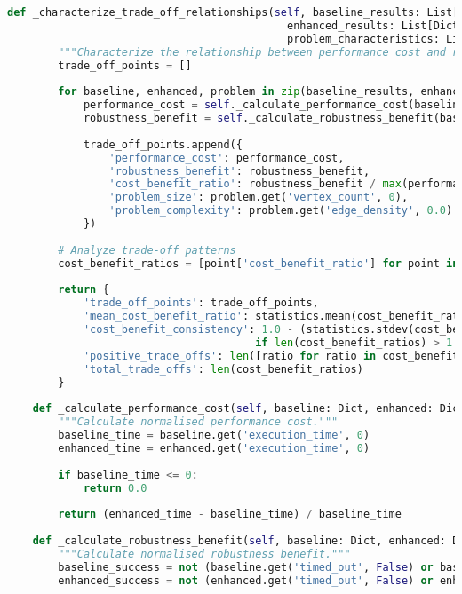 \begin{lstlisting}[language=Python, caption=Multi-dimensional Trade-off Analysis and Characterisation]
    def _characterize_trade_off_relationships(self, baseline_results: List[Dict], 
                                            enhanced_results: List[Dict],
                                            problem_characteristics: List[Dict]) -> Dict:
        """Characterize the relationship between performance cost and robustness benefit."""
        trade_off_points = []
        
        for baseline, enhanced, problem in zip(baseline_results, enhanced_results, problem_characteristics):
            performance_cost = self._calculate_performance_cost(baseline, enhanced)
            robustness_benefit = self._calculate_robustness_benefit(baseline, enhanced)
            
            trade_off_points.append({
                'performance_cost': performance_cost,
                'robustness_benefit': robustness_benefit,
                'cost_benefit_ratio': robustness_benefit / max(performance_cost, 0.001),
                'problem_size': problem.get('vertex_count', 0),
                'problem_complexity': problem.get('edge_density', 0.0)
            })
        
        # Analyze trade-off patterns
        cost_benefit_ratios = [point['cost_benefit_ratio'] for point in trade_off_points]
        
        return {
            'trade_off_points': trade_off_points,
            'mean_cost_benefit_ratio': statistics.mean(cost_benefit_ratios) if cost_benefit_ratios else 0.0,
            'cost_benefit_consistency': 1.0 - (statistics.stdev(cost_benefit_ratios) / statistics.mean(cost_benefit_ratios)) 
                                       if len(cost_benefit_ratios) > 1 and statistics.mean(cost_benefit_ratios) > 0 else 0.0,
            'positive_trade_offs': len([ratio for ratio in cost_benefit_ratios if ratio > 1.0]),
            'total_trade_offs': len(cost_benefit_ratios)
        }
    
    def _calculate_performance_cost(self, baseline: Dict, enhanced: Dict) -> float:
        """Calculate normalised performance cost."""
        baseline_time = baseline.get('execution_time', 0)
        enhanced_time = enhanced.get('execution_time', 0)
        
        if baseline_time <= 0:
            return 0.0
        
        return (enhanced_time - baseline_time) / baseline_time
    
    def _calculate_robustness_benefit(self, baseline: Dict, enhanced: Dict) -> float:
        """Calculate normalised robustness benefit."""
        baseline_success = not (baseline.get('timed_out', False) or baseline.get('satisfiable') is None)
        enhanced_success = not (enhanced.get('timed_out', False) or enhanced.get('satisfiable') is None)
        

\end{lstlisting}
